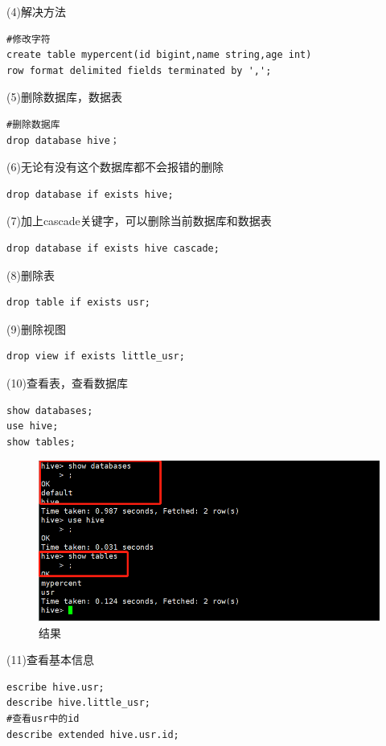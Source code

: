 \documentclass[12pt]{article}
\begin{document}
(4)解决方法
\begin{lstlisting}[language={[ANSI]C}]
#修改字符
create table mypercent(id bigint,name string,age int)
row format delimited fields terminated by ',';
\end{lstlisting}

(5)删除数据库，数据表
\begin{lstlisting}[language={[ANSI]C}]
#删除数据库
drop database hive；
\end{lstlisting}

(6)无论有没有这个数据库都不会报错的删除
\begin{lstlisting}[language={[ANSI]C}]
drop database if exists hive;
\end{lstlisting}
(7)加上cascade关键字，可以删除当前数据库和数据表

\begin{lstlisting}[language={[ANSI]C}]
drop database if exists hive cascade;
\end{lstlisting}

(8)删除表
\begin{lstlisting}[language={[ANSI]C}]
drop table if exists usr;
\end{lstlisting}

(9)删除视图
\begin{lstlisting}[language={[ANSI]C}]
drop view if exists little_usr;
\end{lstlisting}

(10)查看表，查看数据库
\begin{lstlisting}[language={[ANSI]C}]
show databases;
use hive;
show tables;
\end{lstlisting}

\begin{figure}[ht]
\centering
\includegraphics[scale=1.0]{figures/13.png}
\caption{结果}\label{fig:label2}
\end{figure}

(11)查看基本信息
\begin{lstlisting}[language={[ANSI]C}]
escribe hive.usr;
describe hive.little_usr;
#查看usr中的id
describe extended hive.usr.id;
\end{lstlisting}
\end{document}
